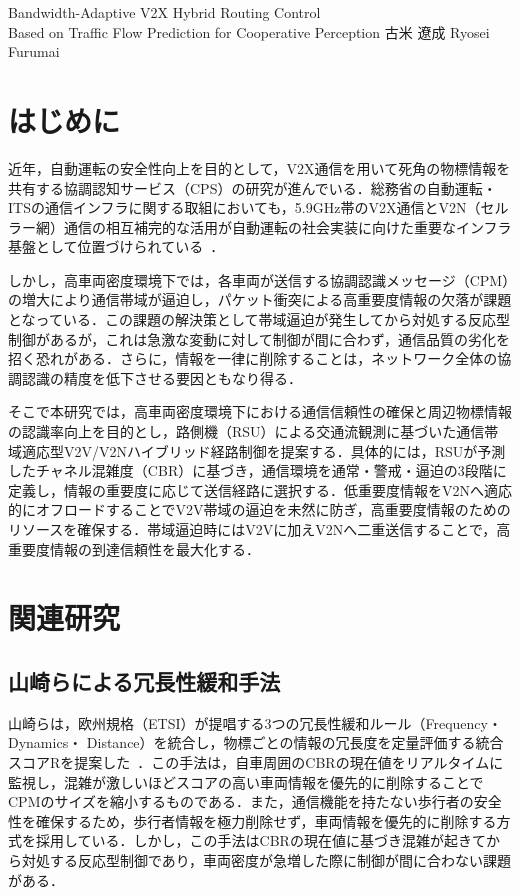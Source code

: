 \documentclass[a4paper,10pt,twocolumn,uplatex]{jsarticle}
\date{11}
\begin{document}
{Bandwidth-Adaptive V2X Hybrid Routing Control
\\Based on Traffic Flow Prediction for Cooperative Perception}
{古米 遼成}
{Ryosei Furumai}

\section{はじめに}
近年，自動運転の安全性向上を目的として，V2X通信を用いて死角の物標情報を共有する協調認知サービス（CPS）の研究が進んでいる．総務省の自動運転・ITSの通信インフラに関する取組においても，5.9GHz帯のV2X通信とV2N（セルラー網）通信の相互補完的な活用が自動運転の社会実装に向けた重要なインフラ基盤として位置づけられている~\cite{digital_lifeline}．

しかし，高車両密度環境下では，各車両が送信する協調認識メッセージ（CPM）の増大により通信帯域が逼迫し，パケット衝突による高重要度情報の欠落が課題となっている．この課題の解決策として帯域逼迫が発生してから対処する反応型制御があるが，これは急激な変動に対して制御が間に合わず，通信品質の劣化を招く恐れがある．さらに，情報を一律に削除することは，ネットワーク全体の協調認識の精度を低下させる要因ともなり得る．

そこで本研究では，高車両密度環境下における通信信頼性の確保と周辺物標情報の認識率向上を目的とし，路側機（RSU）による交通流観測に基づいた通信帯域適応型V2V/V2Nハイブリッド経路制御を提案する．具体的には，RSUが予測したチャネル混雑度（CBR）に基づき，通信環境を通常・警戒・逼迫の3段階に定義し，情報の重要度に応じて送信経路に選択する．低重要度情報をV2Nへ適応的にオフロードすることでV2V帯域の逼迫を未然に防ぎ，高重要度情報のためのリソースを確保する．帯域逼迫時にはV2Vに加えV2Nへ二重送信することで，高重要度情報の到達信頼性を最大化する．

\section{関連研究}
\subsection{山崎らによる冗長性緩和手法}
山崎らは，欧州規格（ETSI）が提唱する3つの冗長性緩和ルール（Frequency・Dynamics・ Distance）を統合し，物標ごとの情報の冗長度を定量評価する統合スコアRを提案した~\cite{山崎2023}．この手法は，自車周囲のCBRの現在値をリアルタイムに監視し，混雑が激しいほどスコアの高い車両情報を優先的に削除することでCPMのサイズを縮小するものである．また，通信機能を持たない歩行者の安全性を確保するため，歩行者情報を極力削除せず，車両情報を優先的に削除する方式を採用している．しかし，この手法はCBRの現在値に基づき混雑が起きてから対処する反応型制御であり，車両密度が急増した際に制御が間に合わない課題がある．
\end{document}
